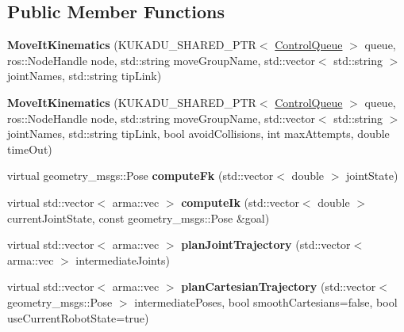 \subsection*{Public Member Functions}
\begin{DoxyCompactItemize}
\item 
\hypertarget{classkukadu_1_1MoveItKinematics_a2014973f734e343eab24ee034b4136ae}{{\bfseries Move\-It\-Kinematics} (K\-U\-K\-A\-D\-U\-\_\-\-S\-H\-A\-R\-E\-D\-\_\-\-P\-T\-R$<$ \hyperlink{classkukadu_1_1ControlQueue}{Control\-Queue} $>$ queue, ros\-::\-Node\-Handle node, std\-::string move\-Group\-Name, std\-::vector$<$ std\-::string $>$ joint\-Names, std\-::string tip\-Link)}\label{classkukadu_1_1MoveItKinematics_a2014973f734e343eab24ee034b4136ae}

\item 
\hypertarget{classkukadu_1_1MoveItKinematics_a5b4c08edeb86780f498525d03669faf5}{{\bfseries Move\-It\-Kinematics} (K\-U\-K\-A\-D\-U\-\_\-\-S\-H\-A\-R\-E\-D\-\_\-\-P\-T\-R$<$ \hyperlink{classkukadu_1_1ControlQueue}{Control\-Queue} $>$ queue, ros\-::\-Node\-Handle node, std\-::string move\-Group\-Name, std\-::vector$<$ std\-::string $>$ joint\-Names, std\-::string tip\-Link, bool avoid\-Collisions, int max\-Attempts, double time\-Out)}\label{classkukadu_1_1MoveItKinematics_a5b4c08edeb86780f498525d03669faf5}

\item 
\hypertarget{classkukadu_1_1MoveItKinematics_a5e0335477c0b1880b1c1cd8ce281933a}{virtual geometry\-\_\-msgs\-::\-Pose {\bfseries compute\-Fk} (std\-::vector$<$ double $>$ joint\-State)}\label{classkukadu_1_1MoveItKinematics_a5e0335477c0b1880b1c1cd8ce281933a}

\item 
\hypertarget{classkukadu_1_1MoveItKinematics_ac79665569fe1c5dde2623c2de0d450f0}{virtual std\-::vector$<$ arma\-::vec $>$ {\bfseries compute\-Ik} (std\-::vector$<$ double $>$ current\-Joint\-State, const geometry\-\_\-msgs\-::\-Pose \&goal)}\label{classkukadu_1_1MoveItKinematics_ac79665569fe1c5dde2623c2de0d450f0}

\item 
\hypertarget{classkukadu_1_1MoveItKinematics_a8e4bd89a6483eff718671d2877297da8}{virtual std\-::vector$<$ arma\-::vec $>$ {\bfseries plan\-Joint\-Trajectory} (std\-::vector$<$ arma\-::vec $>$ intermediate\-Joints)}\label{classkukadu_1_1MoveItKinematics_a8e4bd89a6483eff718671d2877297da8}

\item 
\hypertarget{classkukadu_1_1MoveItKinematics_a1a51e4de20c5b79eccf09ad547de6914}{virtual std\-::vector$<$ arma\-::vec $>$ {\bfseries plan\-Cartesian\-Trajectory} (std\-::vector$<$ geometry\-\_\-msgs\-::\-Pose $>$ intermediate\-Poses, bool smooth\-Cartesians=false, bool use\-Current\-Robot\-State=true)}\label{classkukadu_1_1MoveItKinematics_a1a51e4de20c5b79eccf09ad547de6914}


\end{DoxyCompactItemize}
